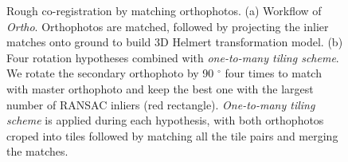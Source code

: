 \begin{figure}[htbp]
\begin{center}
{\begin{minipage}[t]{1\linewidth}
            \end{minipage}%
        }
        \caption{Rough co-registration by matching orthophotos. (a) Workflow of \textit{Ortho}. Orthophotos are matched, followed by projecting the inlier matches onto ground to build 3D Helmert transformation model. (b) Four rotation hypotheses combined with \textit{one-to-many tiling scheme}. We rotate the secondary orthophoto by 90 $^\circ$ four times to match with master orthophoto and keep the best one with the largest number of RANSAC inliers (red rectangle). \textit{One-to-many tiling scheme} is applied during each hypothesis, with both orthophotos croped into tiles followed by matching all the tile pairs and merging the matches.}
        \label{WorkflowOrtho}
    \end{center}
\end{figure}

%


